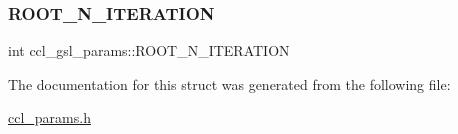\subsubsection{\texorpdfstring{R\+O\+O\+T\+\_\+\+N\+\_\+\+I\+T\+E\+R\+A\+T\+I\+ON}{ROOT\_N\_ITERATION}}
{\footnotesize\ttfamily int ccl\+\_\+gsl\+\_\+params\+::\+R\+O\+O\+T\+\_\+\+N\+\_\+\+I\+T\+E\+R\+A\+T\+I\+ON}



The documentation for this struct was generated from the following file\+:\begin{DoxyCompactItemize}
\item 
\mbox{\hyperlink{ccl__params_8h}{ccl\+\_\+params.\+h}}\end{DoxyCompactItemize}
